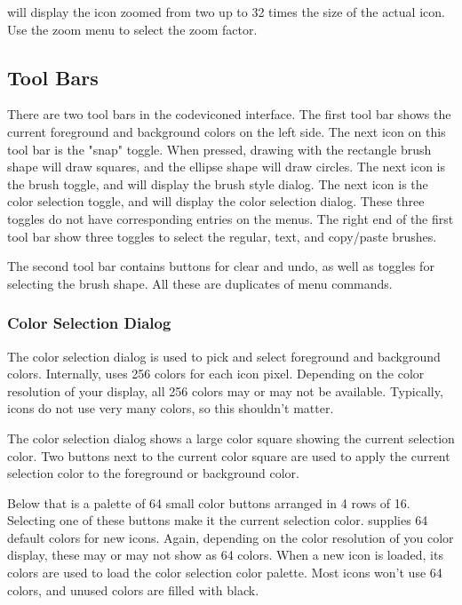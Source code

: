 will display the icon zoomed from two up to
32 times the size of the actual icon. Use the zoom menu to
select the zoom factor.

\subsection{Tool Bars}

There are two tool bars in the code{viconed} interface.
The first tool bar shows the current foreground and background
colors on the left side. The next icon on this tool bar is
the "snap" toggle. When pressed, drawing with the rectangle
brush shape will draw squares, and the ellipse shape will draw
circles. The next icon is the brush toggle, and will display
the brush style dialog. The next icon is the color selection
toggle, and will display the color selection dialog. These three
toggles do not have corresponding entries on the menus.
The right end of the first tool bar show three toggles to
select the regular, text, and copy/paste brushes.

The second tool bar contains buttons for clear and undo,
as well as toggles for selecting the brush shape. All these
are duplicates of menu commands.

\subsubsection*{Color Selection Dialog}

The color selection dialog is used to pick and select foreground
and background colors. Internally,  uses 256 colors
for each icon pixel. Depending on the color resolution of your
display, all 256 colors may or may not be available. Typically,
icons do not use very many colors, so this shouldn't matter.

The color selection dialog shows a large color square
showing the current selection color. Two buttons next to the
current color square are used to apply the current selection
color to the foreground or background color.

Below that is a palette of 64 small color buttons arranged in
4 rows of 16. Selecting one of these buttons make it the
current selection color.  supplies 64 default
colors for new icons. Again, depending on the color resolution
of you color display, these may or may not show as 64 colors.
When a new icon is loaded, its colors are used to load the
color selection color palette. Most icons won't use 64 colors,
and unused colors are filled with black.

